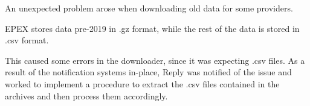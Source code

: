 An unexpected problem arose when downloading old data for some providers.

\reword
EPEX stores data pre-2019 in .gz format, while the rest of the data is stored in .csv format.

This caused some errors in the downloader, since it was expecting .csv files.
As a result of the notification systems in-place, Reply was notified of the issue and worked to implement a procedure to extract the .csv files contained in the archives and then process them accordingly.


